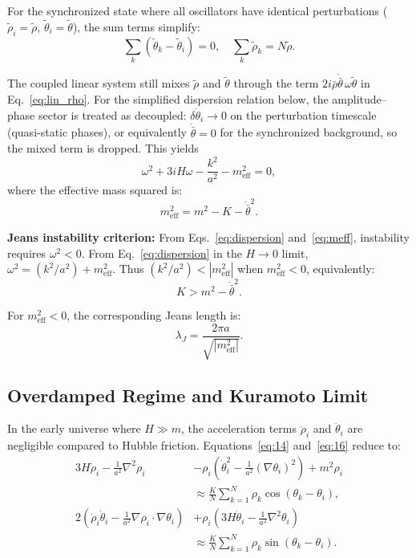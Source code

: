 For the synchronized state where all oscillators have identical perturbations ($\tilde{\rho}_i = \tilde{\rho}$, $\tilde{\theta}_i = \tilde{\theta}$), the sum terms simplify:
\begin{equation}
\sum_k (\tilde{\theta}_k - \tilde{\theta}_i) = 0, \quad \sum_k \tilde{\rho}_k = N\tilde{\rho}.
\end{equation}

The coupled linear system still mixes $\tilde{\rho}$ and $\tilde{\theta}$ through the term $2i\bar{\rho}\dot{\bar{\theta}}\,\omega\tilde{\theta}$ in Eq.~\eqref{eq:lin_rho}.
For the simplified dispersion relation below, the amplitude--phase sector is treated as decoupled: $\delta\dot{\theta}_i\to 0$ on the perturbation timescale (quasi-static phases), or equivalently $\dot{\bar{\theta}}=0$ for the synchronized background, so the mixed term is dropped.
This yields
\begin{equation}
\omega^2 + 3iH\omega - \frac{k^2}{a^2} - m_{\mathrm{eff}}^2 = 0,
\label{eq:dispersion}
\end{equation}
where the effective mass squared is:
\begin{equation}
m_{\mathrm{eff}}^2 = m^2 - K - \dot{\bar{\theta}}^2.
\label{eq:meff}
\end{equation}

\textbf{Jeans instability criterion:} From Eqs.~\eqref{eq:dispersion} and~\eqref{eq:meff}, instability requires $\omega^2<0$.
From Eq.~\eqref{eq:dispersion} in the $H\to 0$ limit, $\omega^2=(k^2/a^2)+m_{\mathrm{eff}}^2$.
Thus $(k^2/a^2)<|m_{\mathrm{eff}}^2|$ when $m_{\mathrm{eff}}^2<0$, equivalently:
\begin{equation}
K > m^2 - \dot{\bar{\theta}}^2.
\label{eq:jeans_cond}
\end{equation}

For $m_{\mathrm{eff}}^2<0$, the corresponding Jeans length is:
\begin{equation}
\lambda_J = \frac{2\pi a}{\sqrt{|m_{\mathrm{eff}}^2|}}.
\label{eq:jeans_length}
\end{equation}

\subsection{Overdamped Regime and Kuramoto Limit}

In the early universe where $H \gg m$, the acceleration terms $\ddot{\rho}_i$ and $\ddot{\theta}_i$ are negligible compared to Hubble friction. Equations~\eqref{eq:14} and~\eqref{eq:16} reduce to:
\begin{align}
3H\dot{\rho}_i - \frac{1}{a^2}\nabla^2\rho_i
&- \rho_i\left(\dot{\theta}_i^2 - \frac{1}{a^2}(\nabla\theta_i)^2\right) + m^2\rho_i \nonumber\\
&\approx \frac{K}{N}\sum_{k=1}^N \rho_k\cos(\theta_k - \theta_i), \label{eq:od_rho} \\
2\left(\dot{\rho}_i\dot{\theta}_i - \frac{1}{a^2}\nabla\rho_i\cdot\nabla\theta_i\right)
&+ \rho_i\left(3H\dot{\theta}_i - \frac{1}{a^2}\nabla^2\theta_i\right) \nonumber\\
&\approx \frac{K}{N}\sum_{k=1}^N \rho_k\sin(\theta_k - \theta_i). \label{eq:od_theta}
\end{align}

